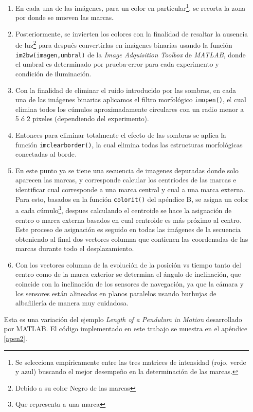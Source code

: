 \documentclass[10pt]{report}
\numberwithin{equation}{chapter}
\numberwithin{algorithm}{chapter}
\begin{document}
\begin{enumerate}
\item En cada una de las imágenes, para un color en particular\footnote{Se selecciona empíricamente entre las tres matrices de intensidad (rojo, verde y azul) buscando el mejor desempeño en la determinación de las marcas.},  se recorta la zona por donde se mueven las marcas. 
\item Posteriormente, se invierten los colores con la finalidad de resaltar la ausencia de luz\footnote{Debido a su color Negro de las marcas} para después convertirlas en imágenes binarias usando la función \texttt{im2bw(imagen,umbral)} de la \textsl{Image Adquisition Toolbox} de \textsl{MATLAB}, donde el umbral es determinado por prueba-error para cada experimento y condición de iluminación.
\item Con la finalidad de eliminar el ruido introducido por las sombras, en cada una de las imágenes binarias aplicamos el filtro morfológico \texttt{imopen()}, el cual elimina todos los cúmulos aproximadamente circulares con un radio menor a 5 ó 2 pixeles (dependiendo del experimento).
\item Entonces para eliminar totalmente el efecto de las sombras se aplica la función \texttt{imclearborder()}, la cual elimina todas las estructuras morfológicas conectadas al borde.
\item En este punto ya se tiene una secuencia de imagenes depuradas donde solo aparecen las marcas, y corresponde calcular los centriodes de las marcas e identificar cual corresponde a una marca central y cual a una marca externa. Para esto, basados en la función \texttt{colorit()} del apéndice B, se asigna un color a  cada cúmulo\footnote{Que representa a una marca}, despues calculando el centroide se hace la asignación de centro o marca externa basados en cual centroide es más próximo al centro. Este proceso de asignación es seguido en todas las imágenes de la secuencia obteniendo al final dos vectores columna que contienen las coordenadas de las marcas durante todo el desplazamiento.
\item Con los vectores columna de la evolución de la posición vs tiempo tanto del centro como de la marca exterior se determina el ángulo de inclinación, que coincide con la inclinación de los sensores de navegación, ya que la cámara y los sensores están alineados en planos paralelos usando burbujas de albañilería de manera muy cuidadosa.
\end{enumerate}
Esta es una variación del ejemplo \textsl{Length of a Pendulum in Motion} desarrollado por MATLAB. El código implementado en este trabajo se muestra en el apéndice \ref{apen2}.\par
\end{document}
